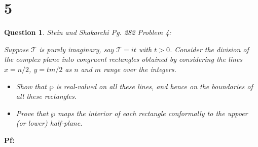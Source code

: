 \documentclass{article}
\newtheorem{question}{Question}
\begin{document}
\break

\section*{5}
\begin{myBox}[]{}
    \begin{question}
        Stein and Shakarchi Pg. 282 Problem 4:

        Suppose $\mathcal{T}$ is purely imaginary, say $\mathcal{T}=it$ with $t>0$. 
        Consider the division of the complex plane into congruent rectangles obtained by considering the lines $x=n/2$, $y=tm/2$ as $n$ and $m$ range over the integers.
        \begin{itemize}
            \item[(a)] Show that $\wp$ is real-valued on all these lines, and hence on the boundaries of all these rectangles.
            \item[(b)] Prove that $\wp$ maps the interior of each rectangle conformally to the uppoer (or lower) half-plane. 
        \end{itemize}
    \end{question}
\end{myBox}

\textbf{Pf:}
\end{document}
